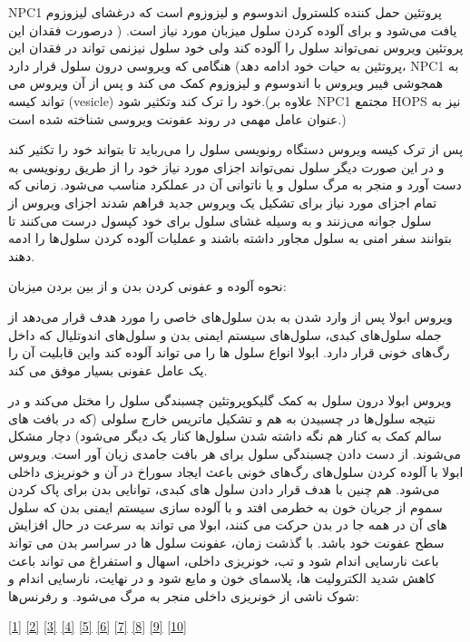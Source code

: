 \documentclass[11pt]{article}
\begin{document}
NPC1  پروتئین حمل کننده کلسترول اندوسوم و لیزوزوم است که درغشای لیزوزوم یافت می‌شود و برای آلوده کردن سلول میزبان مورد نیاز است. ( درصورت فقدان این پروتئین ویروس نمی‌تواند سلول را آلوده کند ولی خود سلول نیزنمی تواند در فقدان این پروتئین  به حیات خود ادامه دهد)
هنگامی که ویروسی درون سلول قرار دارد، NPC1  به همجوشی فیبر ویروس با اندوسوم و لیزوزوم کمک می کند و پس از آن ویروس می تواند کیسه (vesicle) خود را ترک کند وتکثیر شود.(علاوه بر NPC1  مجتمع HOPS نیز به عنوان عامل مهمی در روند عفونت ویروسی شناخته شده است.)

پس از ترک کیسه ویروس دستگاه رونویسی سلول را می‌رباید تا بتواند خود را تکثیر کند و در این صورت دیگر سلول نمی‌تواند اجزای مورد نیاز خود را از طریق رونویسی به دست آورد و منجر به مرگ سلول و یا ناتوانی آن در عملکرد مناسب می‌شود. زمانی که تمام اجزای مورد نیاز برای تشکیل یک ویروس جدید فراهم شدند اجزای ویروس از سلول جوانه می‌زنند و به وسیله غشای سلول برای خود کپسول درست می‌کنند تا بتوانند سفر امنی به سلول مجاور داشته باشند و عملیات آلوده کردن سلول‌ها را ادمه دهند.


نحوه آلوده و عفونی کردن بدن و از بین بردن میزبان:

ویروس ابولا پس از وارد شدن به بدن سلول‌های خاصی را مورد هدف قرار می‌دهد از جمله سلول‌های کبدی، سلول‌های سیستم ایمنی بدن و سلول‌های اندوتلیال که داخل رگ‌های خونی قرار دارد. ابولا انواع سلول ها را می تواند آلوده کند واین قابلیت آن را یک عامل عفونی بسیار موفق می کند.

 ویروس ابولا درون سلول به کمک گلیکوپروتئین چسبندگی سلول را مختل می‌کند و در نتیجه سلول‌ها در چسبیدن به هم و تشکیل ماتریس خارج سلولی (که در بافت های سالم کمک به کنار هم نگه داشته شدن سلول‌ها کنار یک دیگر می‌شود) دچار مشکل می‌شوند. از دست دادن چسبندگی سلول برای هر بافت جامدی زیان آور است.
ویروس ابولا با آلوده کردن  سلول‌های رگ‌های خونی  باعث ایجاد سوراخ  در آن و خونریزی داخلی می‌شود. هم چنین با هدف قرار دادن سلول های کبدی، توانایی بدن برای پاک کردن سموم از جریان خون به خطرمی افتد  و با آلوده سازی سیستم ایمنی بدن که سلول های آن در همه جا در بدن حرکت می کنند، ابولا می تواند به سرعت در حال افزایش سطح عفونت خود باشد. با گذشت زمان، عفونت سلول ها در سراسر بدن می تواند باعث نارسایی اندام شود و تب، خونریزی داخلی، اسهال و استفراغ می تواند باعث کاهش شدید الکترولیت ها، پلاسمای خون و مایع شود و در نهایت، نارسایی اندام و شوک ناشی از خونریزی داخلی منجر به مرگ می‌شود.
و رفرنس‌ها:

\href{http://pdb101.rcsb.org/motm/178}{[1]}
\href{https://microbewiki.kenyon.edu/index.php/Ebola_virus_entry_into_host_cells}{[2]}
\href{http://sitn.hms.harvard.edu/flash/2014/ebola-virus-how-it-infects-people-and-how-scientists-are-working-to-cure-it/}{[3]}
\href{https://www.omicsonline.org/open-access/ebola-virus-disease-a-biological-and-epidemiological-perspective-of-avirulent-virus-jidd-1000103.php?aid=71427&view=mobile}{[4]}
\href{https://en.wikipedia.org/wiki/Ebola_virus_disease}{[5]}
\href{https://www.ncbi.nlm.nih.gov/pmc/articles/PMC2829775/}{[6]}
\href{https://www.rcsb.org/structure/4qb0}{[7]}
\href{https://www.rcsb.org/structure/3vne}{[8]}
\href{https://www.rcsb.org/structure/3fke}{[9]}
\href{https://www.rcsb.org/structure/2i8b}{[10]} 
\end{document}
